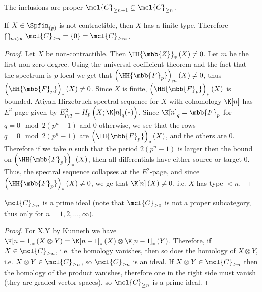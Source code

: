 \begin{proposition}
	The inclusions are proper $\mcl{C}_{\geq n+1} \subsetneq \mcl{C}_{\geq n}$.
\end{proposition}

\begin{proposition}
	If $X \in \Spfin_{\left(p\right)}$ is not contractible, then $X$ has a finite type.
	Therefore $\bigcap_{n < \infty} \mcl{C}_{\geq n} = \left\{0\right\} = \mcl{C}_{\geq \infty}$.
\end{proposition}

\begin{proof}
	Let $X$ be non-contractible.
	Then $\HH{\mbb{Z}}_*\left(X\right) \neq 0$.
	Let $m$ be the first non-zero degree.
	Using the universal coefficient theorem and the fact that the spectrum is $p$-local we get that $\left(\HH{\mbb{F}_p}\right)_m\left(X\right) \neq 0$, thus $\left(\HH{\mbb{F}_p}\right)_*\left(X\right) \neq 0$.
	Since $X$ is finite, $\left(\HH{\mbb{F}_p}\right)_*\left(X\right)$ is bounded.
	Atiyah-Hirzebruch spectral sequence for $X$ with cohomology $\K[n]$ has $E^2$-page given by
	$
	E_{p,q}^2
	= 
	H_p\left(X; \K[n]_q(*)\right)
	$.
	Since $\K[n]_q = \mbb{F}_p$ for $q = 0 \mod 2\left(p^n-1\right)$ and $0$ otherwise,
	we see that the rows $q = 0 \mod 2\left(p^n-1\right)$ are $\left(\HH{\mbb{F}_p}\right)_*\left(X\right)$, and the others are $0$.
	Therefore if we take $n$ such that the period $2\left(p^n-1\right)$ is larger then the bound on $\left(\HH{\mbb{F}_p}\right)_*\left(X\right)$, then all differentials have either source or target $0$.
	Thus, the spectral sequence collapses at the $E^2$-page, and since $\left(\HH{\mbb{F}_p}\right)_*\left(X\right) \neq 0$, we ge that $\K[n]\left(X\right) \neq 0$, i.e. $X$ has type $<n$.
\end{proof}

\begin{proposition}
	$\mcl{C}_{\geq n}$ is a prime ideal (note that $\mcl{C}_{\geq 0}$ is not a proper subcategory, thus only for $n=1,2,\dotsc,\infty$).
\end{proposition}

\begin{proof}
	For X,Y by Kunneth we have $\K[n-1]_*\left(X \otimes  Y\right) = \K[n-1]_*\left(X\right) \otimes \K[n-1]_*\left(Y\right)$.
	Therefore, if $X \in \mcl{C}_{\geq n}$, i.e. the homology vanishes, then so does the homology of $X \otimes Y$, i.e. $X \otimes Y \in \mcl{C}_{\geq n}$, so $\mcl{C}_{\geq n}$ is an ideal.
	If $X \otimes Y\in \mcl{C}_{\geq n}$ then the homology of the product vanishes, therefore one in the right side must vanish (they are graded vector spaces), so $\mcl{C}_{\geq n}$ is a prime ideal.
\end{proof}

